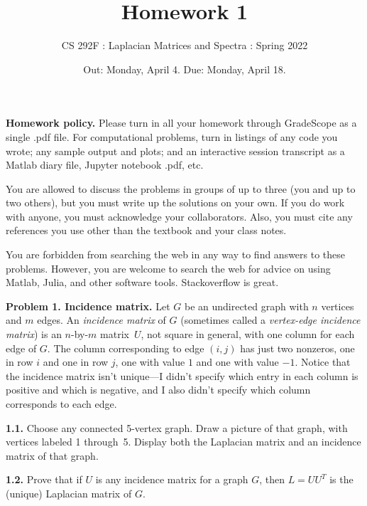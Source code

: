 \documentclass[11pt]{article}
\begin{document}

\title{Homework 1}
\author{CS 292F : Laplacian Matrices and Spectra : Spring 2022}

\date{Out: Monday, April 4. Due: Monday, April 18.}
\maketitle

{\bf Homework policy.} 
Please turn in all your homework through GradeScope as a single .pdf file.
For computational problems, turn in listings of any code you wrote; 
any sample output and plots; and an interactive session transcript as
a Matlab diary file, Jupyter notebook .pdf, etc.

You are allowed to discuss the problems in groups of up to three 
(you and up to two others), but you must write up the solutions 
on your own. If you do work with anyone, you must acknowledge your
collaborators. Also, you must cite any references you use other than
the textbook and your class notes.

You are forbidden from searching the web in any way to find answers
to these problems. However, you are welcome to search the web for
advice on using Matlab, Julia, and other software tools. Stackoverflow
is great.
\par\bigskip

{\bf Problem 1. Incidence matrix.} 
Let $G$ be an undirected graph with $n$ vertices and $m$ edges.
An {\em incidence matrix} of $G$ (sometimes called a
{\em vertex-edge incidence matrix}) is an $n$-by-$m$ matrix~$U$,
not square in general, with one column for each edge of $G$.
The column corresponding to edge $(i,j)$ has just two nonzeros, 
one in row $i$ and one in row $j$, one with value $1$ and one 
with value $-1$.
Notice that the incidence matrix isn't unique---I didn't specify
which entry in each column is positive and which is negative,
and I also didn't specify which column corresponds to each edge.

\par\bigskip
{\bf 1.1.} 
Choose any connected 5-vertex graph.  
Draw a picture of that graph, with vertices labeled 1 through~5.
Display both the Laplacian matrix and an incidence matrix of that graph.

\par\bigskip
{\bf 1.2.} 
Prove that if $U$ is any incidence matrix for a graph $G$, 
then $L=UU^T$ is the (unique) Laplacian matrix of $G$.
\end{document}
